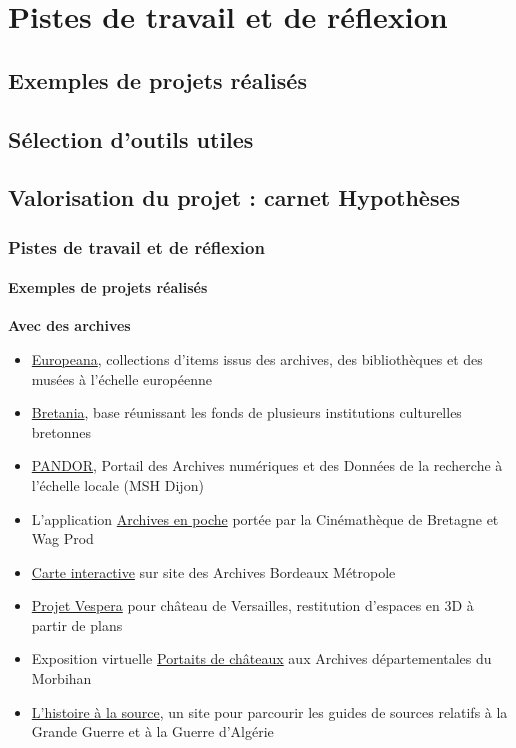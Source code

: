 \documentclass[xcolor=table]{beamer}
\begin{document}
\section{Pistes de travail et de r\'eflexion}
\subsection{Exemples de projets r\'ealis\'es}
\subsection{S\'election d'outils utiles}
\subsection{Valorisation du projet : carnet Hypoth\`eses}

\begin{frame}[plain]
\frametitle{Pistes de travail et de r\'eflexion}
\framesubtitle{Exemples de projets r\'ealis\'es}
\textbf{Avec des archives}
\begin{itemize}
    \item \href{https://www.europeana.eu/fr}{Europeana}, collections d'items issus des archives, des biblioth\`eques et des mus\'ees \`a
 l'\'echelle europ\'eenne
 \item \href{http://www.bretania.bzh/exploitation/}{Bretania}, base r\'eunissant les fonds de plusieurs institutions culturelles bretonnes
    \item \href{https://pandor.u-bourgogne.fr/}{PANDOR}, Portail des Archives num\'eriques et des Donn\'ees de la recherche \`a
 l'\'echelle locale (MSH Dijon)
    \item L'application \href{https://www.ouest-france.fr/bretagne/rennes-35000/rennes-avec-archives-en-poche-rembobinez-l-histoire-de-la-ville-7031689}{Archives en poche} port\'ee par la Cin\'emath\`eque de Bretagne et Wag Prod
    \item \href{https://archives.bordeaux-metropole.fr/c-etait-ici/carte/n:48}{Carte interactive} sur site des Archives Bordeaux M\'etropole
    \item \href{https://chateauversailles-recherche.fr/francais/recherche/projets-scientifiques-et-recherche-appliquee/projet-verspera}{Projet Vespera} pour ch\^ateau de Versailles, restitution d'espaces en 3D \`a partir de plans
    \item Exposition virtuelle \og \href{https://recherche.archives.morbihan.fr/expositions/exposition-portraits-de-chateaux-59}{Portaits de ch\^ateaux}\fg{} aux Archives d\'epartementales du Morbihan
    \item\href{http://histoirealasource.ille-et-vilaine.fr/}{L'histoire \`a la source}, un site pour parcourir les guides de sources relatifs \`a la Grande Guerre et \`a la Guerre d'Alg\'erie
\end{itemize}
\end{frame}
\end{document}
